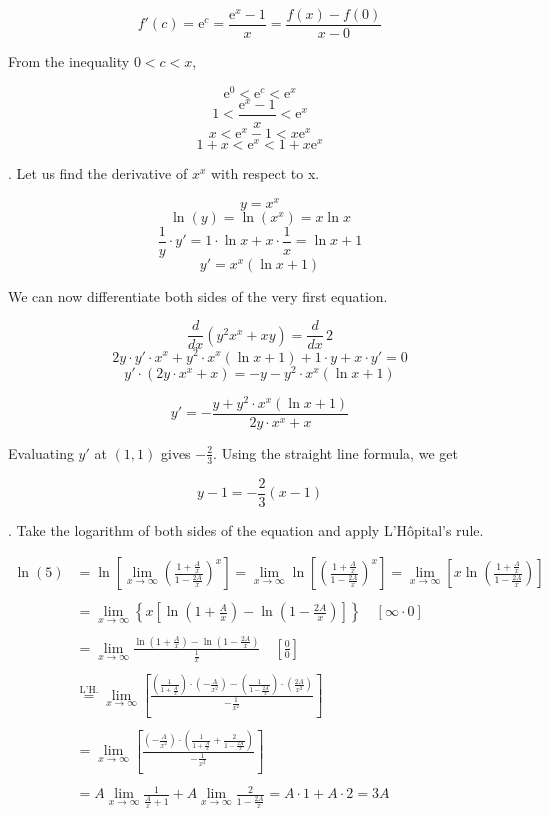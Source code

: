 \documentclass{article}
\begin{document}
\[
f'(c) = \mathrm{e}^c=\frac{\mathrm{e}^x-1}x=\frac{f(x)-f(0)}{x-0}
\]

\hfill

\noindent From the inequality $0<c<x$,

\[\mathrm{e}^0<\mathrm{e}^c<\mathrm{e}^x\]
\[1<\frac{\mathrm{e}^x-1}x<\mathrm{e}^x\]
\[x<\mathrm{e}^x-1 <x\mathrm{e}^x\]
\[1+x<\mathrm{e}^x <1+x\mathrm{e}^x\]

\hfill

. Let us find the derivative of $x^x$ with respect to x.

\[y=x^x\]
\[\ln(y)=\ln(x^x) = x\ln x\]
\[\frac1y\cdot y'=1\cdot\ln x + x\cdot \frac1x = \ln x +1\]
\[y'=x^x(\ln x+1)\]

\hfill

\noindent We can now differentiate both sides of the very first equation.

\[\frac d{dx}\left(y^2x^x + xy\right) = \frac d{dx}\,2\]
\[2y\cdot y'\cdot x^x + y^2\cdot x^x(\ln x+1)+1\cdot y +x\cdot y'=0\]
\[y'\cdot\left(2y\cdot x^x + x\right)=-y-y^2\cdot x^x(\ln x+1)\]

\[y'=-\frac{y+y^2\cdot x^x(\ln x+1)}{2y\cdot x^x+x}\]

\hfill

\noindent Evaluating $y'$ at $(1,1)$ gives $\displaystyle-\frac23$. Using the straight line formula, we get

\[
\boxed{y-1 =-\frac23(x-1)}
\]

\newpage

. Take the logarithm of both sides of the equation and apply L'Hôpital's rule.

\begin{align*}
\ln(5)&=\ln\left[\lim_{x\to\infty}\left(\frac{\displaystyle1+\frac Ax}{\displaystyle1-\frac {2A}x}\right)^{x}\right]=\lim_{x\to\infty}\ln\left[\left(\frac{\displaystyle1+\frac Ax}{\displaystyle1-\frac {2A}x}\right)^{x}\right]=\lim_{x\to\infty}\left[x\ln\left(\frac{\displaystyle1+\frac Ax}{\displaystyle1-\frac {2A}x}\right)\right]\\\\&=\lim_{x\to\infty}\left\{x\left[\ln\left(1+\frac Ax\right)-\ln\left(1-\frac {2A}x\right)\right]\right\}\quad\left[\infty\cdot0\right]\\\\&=\lim_{x\to\infty}\frac{\displaystyle\ln\left(1+\frac Ax\right)-\ln\left(1-\frac {2A}x\right)}{\displaystyle\frac1x}\quad\left[\frac00\right]\\\\&\overset{\text{L'H.}}{=}\lim_{x\to\infty}\left[\frac{\displaystyle\left(\frac1{1+\frac Ax}\right)\cdot\left(-\frac{A}{x^2}\right)-\left(\frac1{1-\frac{2A}x}\right)\cdot\left(\frac{2A}{x^2}\right)}{\displaystyle -\frac1{x^2}}\right]\\\\&=\lim_{x\to\infty}\left[\frac{\displaystyle\left(-\frac{A}{x^2}\right)\cdot\left(\frac1{1+\frac{A}x}+\frac{2}{1-\frac{2A}x}\right)}{\displaystyle-\frac{1}{x^2}}\right]\\\\&=A\lim_{x\to\infty}\frac1{\frac Ax + 1}+A\lim_{x\to\infty}\frac2{1-\frac{2A}x} = A \cdot 1 + A \cdot 2 = 3A
\end{align*}
\end{document}
